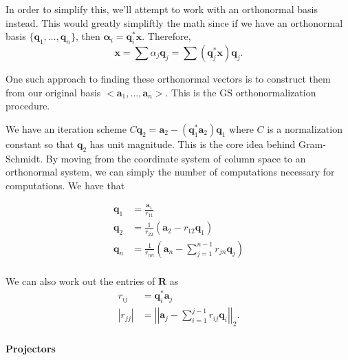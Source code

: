 \documentclass[12pt]{article}
\newcommand{\abs}[1]{ \left| #1 \right| }
\newcommand{\norm}[1]{ \left|\left| #1 \right|\right| }
\renewcommand{\vec}[1]{\mathbf{#1}}
\theoremstyle{definition}
\theoremstyle{remark}
\numberwithin{equation}{section}
\begin{document}
In order to simplify this, we'll attempt to work with an orthonormal basis instead. This would greatly simpliftly the math since if we have an orthonormal basis $\{\vec{q}_1, \ldots, \vec{q}_n \}$, then $\vec{\alpha}_i = \vec{q}^*_i \vec{x}$. Therefore,
\begin{equation}
  \vec{x} = \sum \alpha_j \vec{q}_j = \sum (\vec{q}_j ^* \vec{x}) \vec{q}_j.
\end{equation}

One such approach to finding these orthonormal vectors is to construct them from our original basis $<\vec{a}_1,\ldots, \vec{a}_n>$. This is the GS orthonormalization procedure.

We have an iteration scheme $C\vec{q}_{2} = \vec{a}_{2} - (\vec{q}_{1}^* \vec{a}_{2})\vec{q}_{1}$ where $C$ is a normalization constant so that $\vec{q}_2$ has unit magnitude. This is the core idea behind Gram-Schmidt. By moving from the coordinate system of column space to an orthonormal system, we can simply the number of computations necessary for computations.
We have that

\begin{align}
  \vec{q}_1 &= \frac{\vec{a}_1}{r_{11}} \\
  \vec{q}_2 &= \frac{1}{r_{22}}\left(\vec{a}_2 - r_{12}\vec{q}_1 \right)\\
  \vec{q}_n &= \frac{1}{r_{nn}} \left( \vec{a}_n - \sum_{j=1}^{n-1} r_{jn}\vec{q}_j \right)\\
\end{align}

We can also work out the entries of $\vec{R}$ as
\begin{align}
  r_{ij} &= \vec{q}_i^*\vec{a}_j \\
  \abs{r_{jj}} &= \norm{ \vec{a}_j - \sum_{i=1}^{j-1} r_{ij}\vec{q}_i }_2.
\end{align}



\paragraph{Projectors}%
\label{par:projectors}
\end{document}
